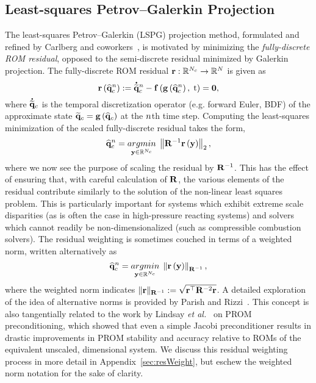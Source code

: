 \subsection{Least-squares Petrov--Galerkin Projection}

The least-squares Petrov--Galerkin (LSPG) projection method, formulated and refined by Carlberg and coworkers~\cite{Carlberg2010,Carlberg2013,Carlberg2017}, is motivated by minimizing the \textit{fully-discrete ROM residual}, opposed to the semi-discrete residual minimized by Galerkin projection. The fully-discrete ROM residual $\mathbf{r}: \mathbb{R}^{N_c} \rightarrow \mathbb{R}^{N}$ is given as
%
\begin{equation}
    \mathbf{r}\left(\mathbf{\widehat{q}}_{c}^{n}\right) := \accentset{\mbox{\large\bfseries .}}{\mathbf{\widetilde{q}}}_{c}^{n} - \mathbf{f} \left(\mathbf{g} \left(\mathbf{\widehat{q}}_{c}^{n}\right), \; \text{t}\right) = \mathbf{0},
\end{equation}
%
where $\accentset{\mbox{\large\bfseries .}}{\mathbf{\widetilde{q}}}_{c}$ is the temporal discretization operator (e.g. forward Euler, BDF) of the approximate state $\mathbf{\widetilde{q}}_{c} = \mathbf{g} \left(\mathbf{\widehat{q}}_{c}\right)$ at the $n$th time step. Computing the least-squares minimization of the scaled fully-discrete residual takes the form,
%
\begin{equation}\label{eq:lspgLS}
    \consVecCoef^{\timeIdx} = \argmin{\dummyVec \inROne{\numConsModes}} \left\Vert \resScaleInv \resFunc{\dummyVec} \right\Vert_2,
\end{equation}
%
where we now see the purpose of scaling the residual by $\resScaleInv$. This has the effect of ensuring that, with careful calculation of $\resScale$, the various elements of the residual contribute similarly to the solution of the non-linear least squares problem. This is particularly important for systems which exhibit extreme scale disparities (as is often the case in high-pressure reacting systems) and solvers which cannot readily be non-dimensionalized (such as compressible combustion solvers). The residual weighting is sometimes couched in terms of a weighted norm, written alternatively as
%
\begin{equation}
	\consVecCoef^{\timeIdx} = \argmin{\dummyVec \inROne{\numConsModes}} \left\Vert \resFunc{\dummyVec} \right\Vert_{\resScaleInv},
\end{equation}
%
where the weighted norm indicates $\Vert\resVec\Vert_{\resScaleInv} \defEq \sqrt{\resVec^\top \resScale^{-2} \resVec}$. A detailed exploration of the idea of alternative norms is provided by Parish and Rizzi~\cite{Parish2022}. This concept is also tangentially related to the work by Lindsay \textit{et al.}~\cite{Lindsay2022} on PROM preconditioning, which showed that even a simple Jacobi preconditioner results in drastic improvements in PROM stability and accuracy relative to ROMs of the equivalent unscaled, dimensional system. We discuss this residual weighting process in more detail in Appendix~\ref{sec:resWeight}, but eschew the weighted norm notation for the sake of clarity.

